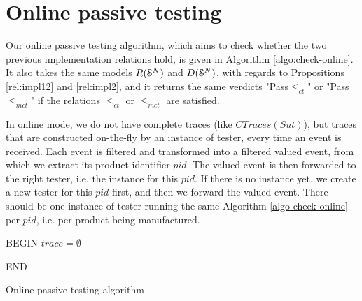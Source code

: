 \section{Online passive testing}
\label{sec:testing:online}

Our online passive testing algorithm, which aims to check whether
the two previous implementation relations hold, is given in
Algorithm \ref{algo:check-online}. It also takes the same models
$R(\EuScript{S}^{N})$ and $D(\EuScript{S}^{N})$, with regards to
Propositions \ref{rel:impl12} and \ref{rel:impl2}, and it returns
the same verdicts "Pass$\leq_{ct}$" or "Pass$\leq_{mct}$" if the
relations $\leq_{ct}$ or $\leq_{mct}$ are satisfied.

In online mode, we do not have complete traces (like
$CTraces({Sut})$), but traces that are constructed on-the-fly by
an instance of tester, every time an event is received. Each event
is filtered and transformed into a filtered valued event, from
which we extract its product identifier $pid$. The valued event
is then forwarded to the right tester, i.e. the instance for this
$pid$. If there is no instance yet, we create a new tester for
this $pid$ first, and then we forward the valued event. There
should be one instance of tester running the same Algorithm
\ref{algo-check-online} per $pid$, i.e. per product being
manufactured.



\begin{algorithm}[h]


    BEGIN\;
    $trace = \emptyset$\;


    END\;

    \caption{Online passive testing algorithm}
    \label{algo:check-online}
\end{algorithm}
